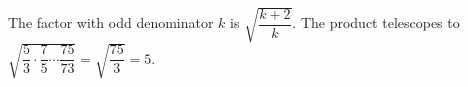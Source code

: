 The factor with odd denominator $k$ is $\sqrt{\dfrac{k+2}{k}}$. The product telescopes to $\sqrt{\dfrac{5}{3}\cdot\dfrac{7}{5}\cdots\dfrac{75}{73}}=\sqrt{\dfrac{75}{3}}=\boxed5$.
